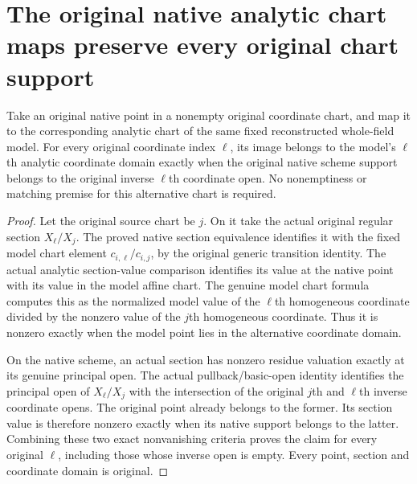 \section{The original native analytic chart maps preserve every original chart support}
\label{sec:projective-fixed-native-analytic-support}

\begin{theorem}
\label{thm:projective-fixed-native-analytic-support}
\leanok
{}
Take an original native point in a nonempty original coordinate chart,
and map it to the corresponding analytic chart of the same fixed
reconstructed whole-field model. For every original coordinate index
$\ell$, its image belongs to the model's $\ell$th analytic coordinate
domain exactly when the original native scheme support belongs to the
original inverse $\ell$th coordinate open. No nonemptiness or matching
premise for this alternative chart is required.
\end{theorem}
\begin{proof}
Let the original source chart be $j$. On it take the actual original
regular section $X_\ell/X_j$. The proved native section equivalence
identifies it with the fixed model chart element
$c_{i,\ell}/c_{i,j}$, by the original generic transition identity.
The actual analytic section-value comparison identifies its value at
the native point with its value in the model affine chart. The genuine
model chart formula computes this as the normalized model value of
the $\ell$th homogeneous coordinate divided by the nonzero value of
the $j$th homogeneous coordinate. Thus it is nonzero exactly when the
model point lies in the alternative coordinate domain.

On the native scheme, an actual section has nonzero residue valuation
exactly at its genuine principal open. The actual pullback/basic-open
identity identifies the principal open of $X_\ell/X_j$ with the
intersection of the original $j$th and $\ell$th inverse coordinate
opens. The original point already belongs to the former. Its section
value is therefore nonzero exactly when its native support belongs to
the latter. Combining these two exact nonvanishing criteria proves
the claim for every original $\ell$, including those whose inverse
open is empty. Every point, section and coordinate domain is original.
\end{proof}
